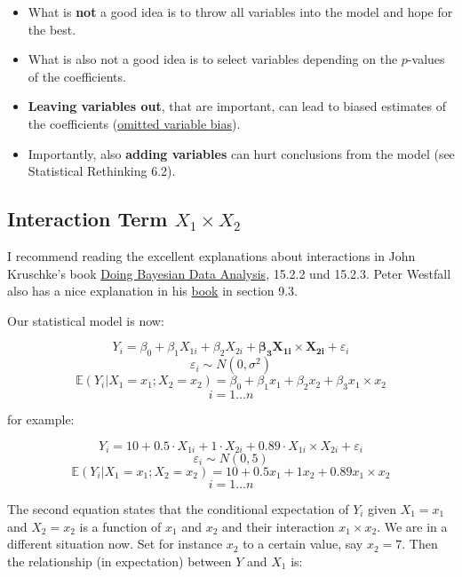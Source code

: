\documentclass[
]{book}
\providecommand{\tightlist}{%
  \setlength{\itemsep}{0pt}\setlength{\parskip}{0pt}}
\begin{document}
\begin{itemize}
\tightlist
\item
  What is \textbf{not} a good idea is to throw all variables into the model and hope for the best.
\item
  What is also not a good idea is to select variables depending on the \(p\)-values of the coefficients.
\item
  \textbf{Leaving variables out}, that are important, can lead to biased estimates of the coefficients
  (\href{https://en.wikipedia.org/wiki/Omitted-variable_bias}{omitted variable bias}).
\item
  Importantly, also \textbf{adding variables} can hurt conclusions from the model (see Statistical Rethinking 6.2).
\end{itemize}

\subsection{\texorpdfstring{Interaction Term \(X_1 \times X_2\)}{Interaction Term X\_1 \textbackslash times X\_2}}\label{interaction_term}

I recommend reading the excellent explanations about interactions
in John Kruschke's book \href{https://nyu-cdsc.github.io/learningr/assets/kruschke_bayesian_in_R.pdf}{Doing Bayesian Data Analysis},
15.2.2 und 15.2.3. Peter Westfall also has a nice explanation in his \href{https://www.routledge.com/Understanding-Regression-Analysis-A-Conditional-Distribution-Approach/Westfall-Arias/p/book/9780367493516?srsltid=AfmBOore3O_Ciecl0TTkr9AjPIY1d6OmbQa7o7IAdKpTSkD8s9HkwzD4}{book}
in section 9.3.

Our statistical model is now:

\[ Y_i = \beta_0 + \beta_1 X_{1i} + \beta_2 X_{2i} + \mathbf{\beta_3 X_{1i} \times X_{2i}} + \varepsilon_i\]
\[ \varepsilon_i \sim N(0, \sigma^2)\]
\[ \mathbb{E}(Y_i|X_1 = x_1; X_2 = x_2) = \beta_0 + \beta_1 x_{1} + \beta_2 x_{2} + \beta_3 x_{1} \times x_{2}\]
\[ i = 1 \ldots n\]

for example:

\[ Y_i = 10 + 0.5 \cdot X_{1i} + 1 \cdot X_{2i} + 0.89 \cdot X_{1i} \times X_{2i} + \varepsilon_i\]
\[ \varepsilon_i \sim N(0, 5)\]
\[ \mathbb{E}(Y_i|X_1 = x_1; X_2 = x_2) = 10 + 0.5 x_1 + 1 x_2 + 0.89 x_1 \times x_2\]
\[ i = 1 \ldots n\]

The second equation states that the conditional expectation of \(Y_i\) given \(X_1=x_1\) and \(X_2=x_2\)
is a function of \(x_1\) and \(x_2\) and their interaction \(x_1 \times x_2\). We are in a different situation now.
Set for instance \(x_2\) to a certain value, say \(x_2 = 7\). Then the relationship (in expectation)
between \(Y\) and \(X_1\) is:
\end{document}
